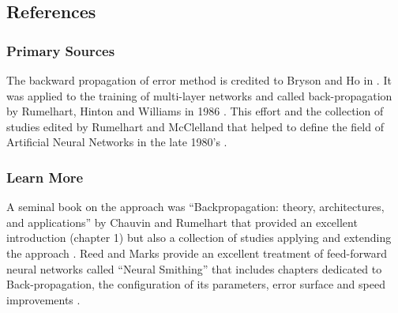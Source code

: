 \subsection{References}

% 
% 
\subsubsection{Primary Sources}
The backward propagation of error method is credited to Bryson and Ho in \cite{Bryson1969}. It was applied to the training of multi-layer networks and called back-propagation by Rumelhart, Hinton and Williams in 1986 \cite{Rumelhart1986b, Rumelhart1986c}. 
This effort and the collection of studies edited by Rumelhart and McClelland that helped to define the field of Artificial Neural Networks in the late 1980's \cite{Rumelhart1986, Rumelhart1986a}.


% 
% 
\subsubsection{Learn More}
A seminal book on the approach was ``Backpropagation: theory, architectures, and applications'' by Chauvin and Rumelhart that provided an excellent introduction (chapter 1) but also a collection of studies applying and extending the approach \cite{Chauvin1995}.
Reed and Marks provide an excellent treatment of feed-forward neural networks called ``Neural Smithing'' that includes chapters dedicated to Back-propagation, the configuration of its parameters, error surface and speed improvements \cite{Reed1999}.


